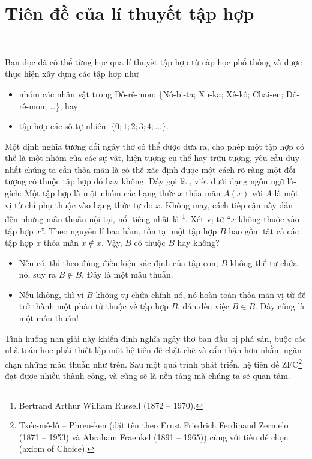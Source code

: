 \chapter{Tiên đề của lí thuyết tập hợp}

\

Bạn đọc đã có thể từng học qua lí thuyết tập hợp từ cấp học phổ thông và được thực hiện xây dựng các tập hợp như
\begin{itemize}
   \item nhóm các nhân vật trong Đô-rê-mon: \{Nô-bi-ta; Xu-ka; Xê-kô; Chai-en; Đô-rê-mon; \dots\}, hay
   \item tập hợp các số tự nhiên: $\{0; 1; 2; 3; 4; \dots\}$.
\end{itemize}
Một định nghĩa tương đối ngây thơ có thể được đưa ra, cho phép một tập hợp có thể là một nhóm của các sự vật, hiện tượng cụ thể hay trừu tượng, yêu cầu duy nhất chúng ta cần thỏa mãn là có thể xác định được một cách rõ ràng một đối tượng có thuộc tập hợp đó hay không. Đây gọi là , viết dưới dạng ngôn ngữ lô-gích: Một tập hợp là một nhóm các hạng thức $x$ thỏa mãn $A(x)$ với $A$ là một vị từ chỉ phụ thuộc vào hạng thức tự do $x$. Không may, cách tiếp cận này dẫn đến những mâu thuẫn nội tại, nổi tiếng nhất là \footnote{Bertrand Arthur William Russell (1872 -- 1970).}. Xét vị từ ``$x$ không thuộc vào tập hợp $x$''. Theo nguyên lí bao hàm, tồn tại một tập hợp $B$ bao gồm tất cả các tập hợp $x$ thỏa mãn $x \notin x$. Vậy, $B$ có thuộc $B$ hay không?
\begin{itemize}
   \item Nếu có, thì theo đúng điều kiện xác định của tập con, $B$ không thể tự chứa nó, suy ra $B \notin B$. Đây là một mâu thuẫn.
   \item Nếu không, thì vì $B$ không tự chứa chính nó, nó hoàn toàn thỏa mãn vị từ để trở thành một phần tử thuộc về tập hợp $B$, dẫn đến việc $B \in B$. Đây cũng là một mâu thuẫn!
\end{itemize}
Tình huống nan giải này khiến định nghĩa ngây thơ ban đầu bị phá sản, buộc các nhà toán học phải thiết lập một hệ tiên đề chặt chẽ và cẩn thận hơn nhằm ngăn chặn những mâu thuẫn như trên. Sau một quá trình phát triển, hệ tiên đề ZFC\footnote{Txéc-mê-lô -- Phren-ken (đặt tên theo Ernst Friedrich Ferdinand Zermelo (1871 -- 1953) và Abraham Fraenkel (1891 -- 1965)) cùng với tiên đề chọn (axiom of Choice).} đạt được nhiều thành công, và cũng sẽ là nền tảng mà chúng ta sẽ quan tâm.









